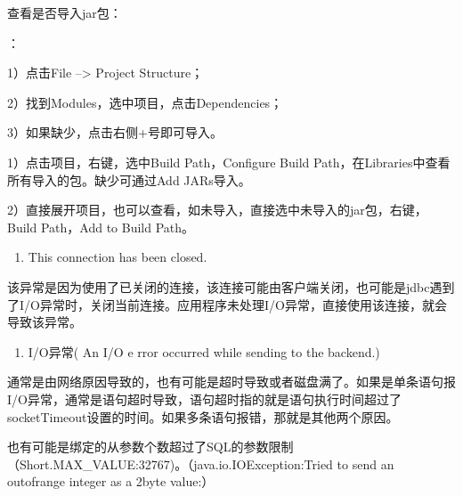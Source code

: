 \documentclass[letterpaper,10pt,english]{sphinxmanual}
\begin{document}
查看是否导入jar包：

：

1）点击File –> Project Structure；

2）找到Modules，选中项目，点击Dependencies；

3）如果缺少，点击右侧+号即可导入。

\begin{figure}[htbp]
\centering

\noindent{}
\end{figure}


1）点击项目，右键，选中Build Path，Configure Build Path，在Libraries中查看所有导入的包。缺少可通过Add JARs导入。

\begin{figure}[htbp]
\centering

\noindent{}
\end{figure}

2）直接展开项目，也可以查看，如未导入，直接选中未导入的jar包，右键，Build Path，Add to Build Path。

\begin{figure}[htbp]
\centering

\noindent{}
\end{figure}
\begin{enumerate}
%
\setcounter{enumi}{3}
\item {} 
This connection has been closed.

\end{enumerate}

该异常是因为使用了已关闭的连接，该连接可能由客户端关闭，也可能是jdbc遇到了I/O异常时，关闭当前连接。应用程序未处理I/O异常，直接使用该连接，就会导致该异常。
\begin{enumerate}
%
\setcounter{enumi}{4}
\item {} 
I/O异常( An I/O e rror occurred while sending to the backend.)

\end{enumerate}

通常是由网络原因导致的，也有可能是超时导致或者磁盘满了。如果是单条语句报I/O异常，通常是语句超时导致，语句超时指的就是语句执行时间超过了socketTimeout设置的时间。如果多条语句报错，那就是其他两个原因。

也有可能是绑定的从参数个数超过了SQL的参数限制（Short.MAX\_VALUE:32767)。（java.io.IOException:Tried to send an out\sphinxhyphen{}of\sphinxhyphen{}range integer as a 2\sphinxhyphen{}byte value:）
\end{document}
